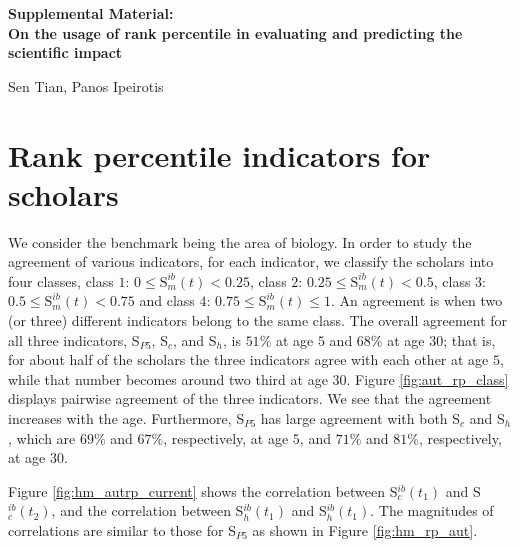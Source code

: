 \clearpage
\begin{refsection}
\beginsupplement
\appendix
{}
\begin{center}
\textbf{\large Supplemental Material: \\ On the usage of rank percentile in evaluating and predicting the scientific impact}

Sen Tian, Panos Ipeirotis
\end{center}

\section{Rank percentile indicators for scholars}
\label{sec:suppl_similarity_autrp}

We consider the benchmark being the area of biology. In order to study the agreement of various indicators, for each indicator, we classify the scholars into four classes, class $1$: $0\le \text{S}_m^{ib}(t) < 0.25$, class $2$: $0.25\le \text{S}_m^{ib}(t) < 0.5$, class $3$: $0.5 \le \text{S}_m^{ib}(t) < 0.75$ and class $4$: $0.75 \le \text{S}_m^{ib}(t) \le 1$. An agreement is when two (or three) different indicators belong to the same class. The overall agreement for all three indicators, S$_{P5}$, S$_c$, and S$_h$, is $51\%$ at age $5$ and $68\%$ at age $30$; that is, for about half of the scholars the three indicators agree with each other at age $5$, while that number becomes around two third at age $30$. Figure \ref{fig:aut_rp_class} displays pairwise agreement of the three indicators. We see that the agreement increases with the age. Furthermore, S$_{P5}$ has large agreement with both S$_{c}$ and S$_{h}$, which are $69\%$ and $67\%$, respectively, at age $5$, and $71\%$ and $81\%$, respectively, at age $30$. 

Figure \ref{fig:hm_autrp_current} shows the correlation between S$_c^{ib}(t_1)$ and S$_c^{ib}(t_2)$, and the correlation between S$_h^{ib}(t_1)$ and S$_h^{ib}(t_1)$. The magnitudes of correlations are similar to those for S$_{P5}$ as shown in Figure \ref{fig:hm_rp_aut}.


\end{refsection}
